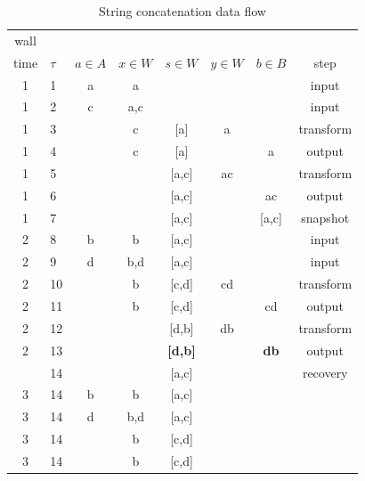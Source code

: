 \begin{table}[htbp]
\begin {center}
\caption{String concatenation data flow}   
\begin{tabular}{c|l|c|c|c|c|c|c}      
wall\\ time & $\tau$& $a\in A$  &$x\in W$& $s\in W$ & $y\in W$ & $b \in B$ & step  \\
\hline
1   &   1   &   a   &   a           &           &       &           &   input \\
1   &   2   &   c   &   a,c         &           &       &           &   input \\
1   &   3   &       &    c          &   [a]     &    a  &           &   transform \\
1   &   4   &       &   c           &   [a]     &       &   a       &   output \\
1   &   5   &       &               &   [a,c]   &   ac  &           &   transform \\
1   &   6   &       &               &   [a,c]   &       &   ac       &   output \\
1   &   7   &       &               &   [a,c]   &       &   [a,c]   &   snapshot \\
2   &   8   &   b    &   b          &   [a,c]   &       &           &   input \\
2   &   9   &   d    &   b,d        &   [a,c]   &       &           &   input \\
2   &   10   &       &   b          &   [c,d]   &  cd   &           &   transform \\
2   &   11   &       &   b          &   [c,d]   &       &      cd     &   output \\
2   &   12   &       &              &   [d,b]    &  db   &           &   transform \\
2   &   13   &       &              &   {\bf [d,b]}    &       &      {\bf db}     &   output \\
\arrayrulecolor{red}\hline
3   &   14   &       &               &   [a,c]         &       &           &   recovery \\
3   &   14   &   b   &   b           &   [a,c]         &       &           &   \\
3   &   14   &   d   &   b,d         &   [a,c]         &       &           &   \\
3   &   14   &       &   b           &   [c,d]         &       &           &   \\
3   &   14   &       &   b           &   [c,d]         &       &           &   \\

\end{tabular}
\end{center}
\end{table}
